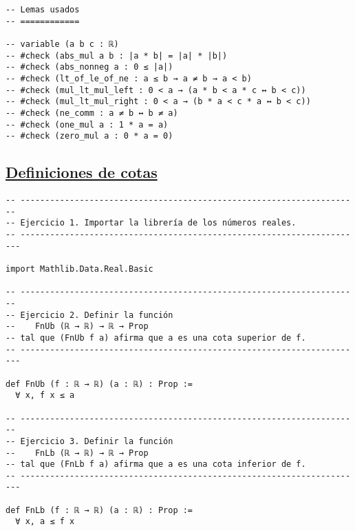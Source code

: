 \begin{verbatim}
-- Lemas usados
-- ============

-- variable (a b c : ℝ)
-- #check (abs_mul a b : |a * b| = |a| * |b|)
-- #check (abs_nonneg a : 0 ≤ |a|)
-- #check (lt_of_le_of_ne : a ≤ b → a ≠ b → a < b)
-- #check (mul_lt_mul_left : 0 < a → (a * b < a * c ↔ b < c))
-- #check (mul_lt_mul_right : 0 < a → (b * a < c * a ↔ b < c))
-- #check (ne_comm : a ≠ b ↔ b ≠ a)
-- #check (one_mul a : 1 * a = a)
-- #check (zero_mul a : 0 * a = 0)
\end{verbatim}

\subsection{\href{./src/Logica/Definiciones\_de\_cotas.lean}{Definiciones de cotas}}
\label{sec:org6669d9c}
\begin{verbatim}
-- ---------------------------------------------------------------------
-- Ejercicio 1. Importar la librería de los números reales.
-- ----------------------------------------------------------------------

import Mathlib.Data.Real.Basic

-- ---------------------------------------------------------------------
-- Ejercicio 2. Definir la función
--    FnUb (ℝ → ℝ) → ℝ → Prop
-- tal que (FnUb f a) afirma que a es una cota superior de f.
-- ----------------------------------------------------------------------

def FnUb (f : ℝ → ℝ) (a : ℝ) : Prop :=
  ∀ x, f x ≤ a

-- ---------------------------------------------------------------------
-- Ejercicio 3. Definir la función
--    FnLb (ℝ → ℝ) → ℝ → Prop
-- tal que (FnLb f a) afirma que a es una cota inferior de f.
-- ----------------------------------------------------------------------

def FnLb (f : ℝ → ℝ) (a : ℝ) : Prop :=
  ∀ x, a ≤ f x
\end{verbatim}

